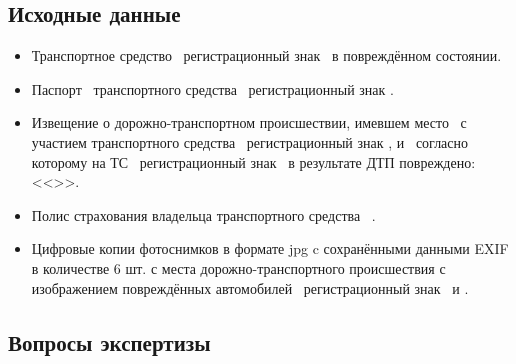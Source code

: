 	                                                       
\subsection{Исходные данные}


\begin{itemize}
\item Транспортное средство \tc\, регистрационный знак \,  в повреждённом состоянии.


\item  Паспорт  \,  транспортного средства   \, регистрационный знак .

\item   Извещение о дорожно-транспортном происшествии, имевшем место  \, с участием  транспортного средства \, регистрационный знак , и \tca\, согласно которому на ТС \, регистрационный знак \,  в результате ДТП повреждено:  << >>.  
 
\item  Полис страхования владельца транспортного средства \,   \polis.

\item  Цифровые копии фотоснимков в формате jpg c сохранёнными данными EXIF в количестве 6 шт.  с места дорожно-транспортного происшествия с изображением повреждённых автомобилей \, регистрационный знак  \, и \tca.


\end{itemize}                                      

\subsection{Вопросы  экспертизы}
      
